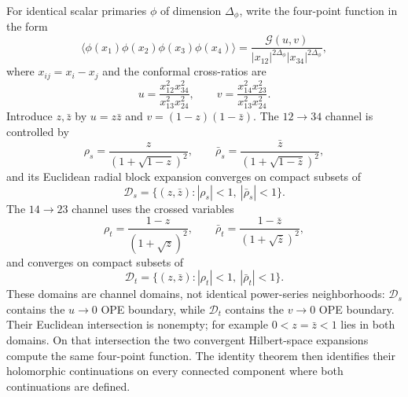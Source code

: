 For identical scalar primaries \(\phi\) of dimension \(\Delta_\phi\), write
the four-point function in the form
\[
  \langle
    \phi(x_1)\phi(x_2)\phi(x_3)\phi(x_4)
  \rangle
  =
  \frac{\mathcal G(u,v)}
       {|x_{12}|^{2\Delta_\phi}|x_{34}|^{2\Delta_\phi}},
\]
where \(x_{ij}=x_i-x_j\) and the conformal cross-ratios are
\[
  u=\frac{x_{12}^2x_{34}^2}{x_{13}^2x_{24}^2},
  \qquad
  v=\frac{x_{14}^2x_{23}^2}{x_{13}^2x_{24}^2}.
\]
Introduce \(z,\bar z\) by \(u=z\bar z\) and
\(v=(1-z)(1-\bar z)\).  The \(12\to34\) channel is controlled by
\[
  \rho_s=\frac{z}{(1+\sqrt{1-z})^2},
  \qquad
  \bar\rho_s=\frac{\bar z}{(1+\sqrt{1-\bar z})^2},
\]
and its Euclidean radial block expansion converges on compact subsets of
\begin{equation}
  \mathcal D_s
  =
  \{(z,\bar z): |\rho_s|<1,\ |\bar\rho_s|<1\}.
  \label{eq:s-channel-radial-domain}
\end{equation}
The \(14\to23\) channel uses the crossed variables
\[
  \rho_t=\frac{1-z}{(1+\sqrt z)^2},
  \qquad
  \bar\rho_t=\frac{1-\bar z}{(1+\sqrt{\bar z})^2},
\]
and converges on compact subsets of
\begin{equation}
  \mathcal D_t
  =
  \{(z,\bar z): |\rho_t|<1,\ |\bar\rho_t|<1\}.
  \label{eq:t-channel-radial-domain}
\end{equation}
These domains are channel domains, not identical power-series neighborhoods:
\(\mathcal D_s\) contains the \(u\to0\) OPE boundary, while
\(\mathcal D_t\) contains the \(v\to0\) OPE boundary.  Their Euclidean
intersection is nonempty; for example \(0<z=\bar z<1\) lies in both domains.
On that intersection the two convergent Hilbert-space expansions compute the
same four-point function.  The identity theorem then identifies their
holomorphic continuations on every connected component where both
continuations are defined.

